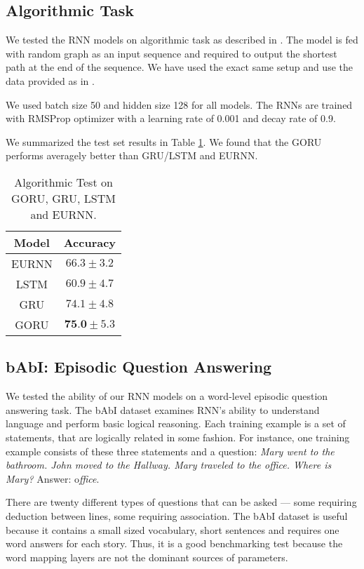 \documentclass[letterpaper]{article} \usepackage{aaai18}  \usepackage{times}  \usepackage{helvet}  \usepackage{courier}  \usepackage{url}  \usepackage{graphicx}
\begin{document}
\subsection{Algorithmic Task}
We tested the RNN models on algorithmic task as described in \cite{li2015gated}. The model is fed with random graph as an input sequence and required to output the shortest path at the end of the sequence. We have used the exact same setup and use the data provided as in \cite{li2015gated}. 

We used batch size 50 and hidden size 128 for all models. The RNNs are trained with RMSProp optimizer with a learning rate of 0.001 and decay rate of 0.9.

We summarized the test set results in Table \ref{tbl:algo_tasks}. We found that the GORU performs averagely better than GRU/LSTM and EURNN. 


\begin{table}[h!]
\centering
\begin{tabular}{cc}
\hline
Model & Accuracy \\
\hline
EURNN & $66.3\pm3.2$ \\
LSTM & $60.9\pm4.7$ \\
GRU & $74.1\pm4.8$ \\
GORU & $\textbf{75.0}\pm5.3$ \\
\hline
\end{tabular}
\caption{Algorithmic Test on GORU, GRU, LSTM and EURNN.}
\label{tbl:algo_tasks}
\end{table}

\subsection{bAbI: Episodic Question Answering}
We tested the ability of our RNN models on a word-level episodic question answering task. The bAbI dataset \cite{weston2015towards} examines RNN's ability to understand language and perform basic logical reasoning. Each training example is a set of statements, that are logically related in some fashion. For instance, one training example consists of these three statements and a question: {\it Mary went to the bathroom. John moved to the Hallway. Mary traveled to the office. Where is Mary?} Answer: o{\it ffice}.

There are twenty different types of questions that can be asked --- some requiring deduction between lines, some requiring association. The bAbI dataset is useful because it contains a small sized vocabulary, short sentences and requires one word answers for each story. Thus, it is a good benchmarking test because the word mapping layers are not the dominant sources of parameters.  
\end{document}
